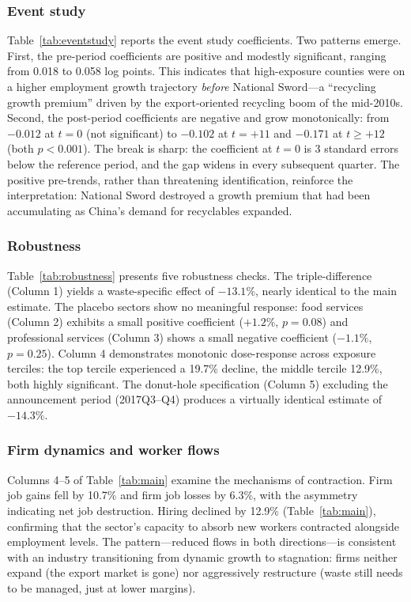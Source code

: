 \documentclass[12pt]{article}
\begin{document}
\subsubsection*{Event study} Table~\ref{tab:eventstudy} reports the event study coefficients. Two patterns emerge. First, the pre-period coefficients are positive and modestly significant, ranging from 0.018 to 0.058 log points. This indicates that high-exposure counties were on a higher employment growth trajectory \textit{before} National Sword---a ``recycling growth premium'' driven by the export-oriented recycling boom of the mid-2010s. Second, the post-period coefficients are negative and grow monotonically: from $-0.012$ at $t = 0$ (not significant) to $-0.102$ at $t = +11$ and $-0.171$ at $t \geq +12$ (both $p < 0.001$). The break is sharp: the coefficient at $t = 0$ is 3 standard errors below the reference period, and the gap widens in every subsequent quarter. The positive pre-trends, rather than threatening identification, reinforce the interpretation: National Sword destroyed a growth premium that had been accumulating as China's demand for recyclables expanded.

\subsubsection*{Robustness} Table~\ref{tab:robustness} presents five robustness checks. The triple-difference (Column 1) yields a waste-specific effect of $-13.1\%$, nearly identical to the main estimate. The placebo sectors show no meaningful response: food services (Column 2) exhibits a small positive coefficient ($+1.2\%$, $p = 0.08$) and professional services (Column 3) shows a small negative coefficient ($-1.1\%$, $p = 0.25$). Column 4 demonstrates monotonic dose-response across exposure terciles: the top tercile experienced a 19.7\% decline, the middle tercile 12.9\%, both highly significant. The donut-hole specification (Column 5) excluding the announcement period (2017Q3--Q4) produces a virtually identical estimate of $-14.3\%$.

\subsubsection*{Firm dynamics and worker flows} Columns 4--5 of Table~\ref{tab:main} examine the mechanisms of contraction. Firm job gains fell by 10.7\% and firm job losses by 6.3\%, with the asymmetry indicating net job destruction. Hiring declined by 12.9\% (Table~\ref{tab:main}), confirming that the sector's capacity to absorb new workers contracted alongside employment levels. The pattern---reduced flows in both directions---is consistent with an industry transitioning from dynamic growth to stagnation: firms neither expand (the export market is gone) nor aggressively restructure (waste still needs to be managed, just at lower margins).
\end{document}
